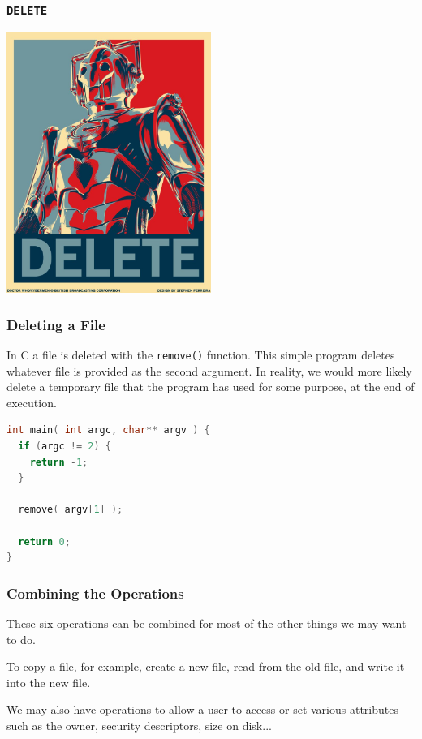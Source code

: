 \begin{frame}
\frametitle{\texttt{DELETE}}

\begin{center}
\includegraphics[width=0.5\textwidth]{images/delete.png}
\end{center}

\end{frame}


\begin{frame}[fragile]
\frametitle{Deleting a File}

In C a file is deleted with the \texttt{remove()} function. This simple program deletes whatever file is provided as the second argument. In reality, we would more likely delete a temporary file that the program has used for some purpose, at the end of execution. 

\begin{lstlisting}[language=C]
int main( int argc, char** argv ) {
  if (argc != 2) {
    return -1;
  }
  
  remove( argv[1] );

  return 0;
}    
\end{lstlisting}

\end{frame}




\begin{frame}
\frametitle{Combining the Operations}

These six operations can be combined for most of the other things we may want to do. 

To copy a file, for example, create a new file, read from the old file, and write it into the new file. 

We may also have operations to allow a user to access or set various attributes such as the owner, security descriptors, size on disk...

\end{frame}

